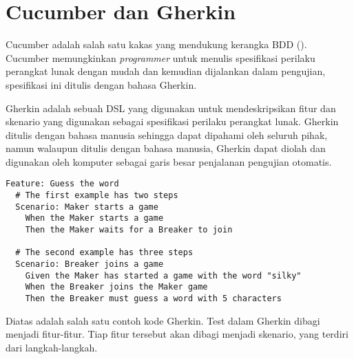 \section{Cucumber dan Gherkin}

Cucumber adalah salah satu kakas yang mendukung kerangka BDD (\cite{cucumber_book}).
Cucumber memungkinkan \emph{programmer} untuk menulis spesifikasi
perilaku perangkat lunak dengan mudah dan kemudian dijalankan dalam pengujian,
spesifikasi ini ditulis dengan bahasa Gherkin.

Gherkin adalah sebuah DSL yang digunakan untuk mendeskripsikan fitur dan skenario
yang digunakan sebagai spesifikasi perilaku perangkat lunak. Gherkin ditulis
dengan bahasa manusia sehingga dapat dipahami oleh seluruh pihak, namun walaupun
ditulis dengan bahasa manusia, Gherkin dapat diolah dan digunakan oleh
komputer sebagai garis besar penjalanan pengujian otomatis.

\begin{lstlisting}[language=Gherkin]
Feature: Guess the word
  # The first example has two steps
  Scenario: Maker starts a game
    When the Maker starts a game
    Then the Maker waits for a Breaker to join

  # The second example has three steps
  Scenario: Breaker joins a game
    Given the Maker has started a game with the word "silky"
    When the Breaker joins the Maker game
    Then the Breaker must guess a word with 5 characters
\end{lstlisting}

Diatas adalah salah satu contoh kode Gherkin.
Test dalam Gherkin dibagi menjadi fitur-fitur. Tiap fitur tersebut akan dibagi menjadi
skenario, yang terdiri dari langkah-langkah.





